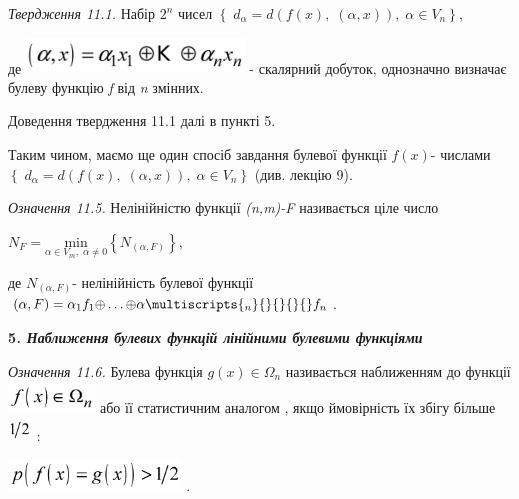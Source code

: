 \textit{Твердження 11.1.}\textit{  }Набір  ${2^{{n}}}$  чисел 
${\left\{\;d_{{\alpha }}=d(f(x),\;(\alpha ,x)),\;\alpha \in V_{{n}}\right\}}$,

де  
\includegraphics[width=2.2783in,height=0.3709in]{crypt-img/crypt-img267.png}  -
скалярний добуток, однозначно визначає булеву функцію \textit{f  }від\textit{
}\textit{n}\textit{ }змінних. 

Доведення  твердження 11.1 далі в пункті 5.

Таким чином, маємо ще один спосіб завдання булевої функції  ${f(x)}${}-  числами
  ${\left\{\;d_{{\alpha }}=d(f(x),\;(\alpha ,x)),\;\alpha \in V_{{n}}\right\}}$
(див. лекцію 9).

\textit{Означення 11.5.} Нелінійністю функції 
\textit{(}\textit{n}\textit{,}\textit{m}\textit{)-}\textit{F}\textit{ 
}називається ціле число

{\centering
 ${N_{{F}}=\underset{{\alpha \in V_{{m}},\;\alpha \neq
0}}{{\text{min}}}\left\{N_{(\alpha ,F)}\right\}}$,
\par}

де  ${N_{{(\alpha ,F)}}}${}-  нелінійність булевої функції  ${(\alpha ,F)=\alpha
_{{1}}f_{{1}}{\oplus}\dots{\oplus}\alpha
\multiscripts{_{{n}}}{}{}{\text{}}{}f_{{n}}}$.


\bigskip

{\bfseries
5\textit{. Наближення булевих функцій лінійними булевими функціями}}

\textit{Означення 11.6.}\textit{ } Булева функція  ${g(x)\in \Omega _{{n}}}$
називається\textcolor{red}{ } наближенням до функції 
\includegraphics[width=0.9098in,height=0.3354in]{crypt-img/crypt-img268.png} 
або її статистичним аналогом , якщо ймовірність їх збігу більше 
\includegraphics[width=0.25in,height=0.2362in]{crypt-img/crypt-img269.png} :

{\centering
 \includegraphics[width=1.8083in,height=0.3319in]{crypt-img/crypt-img270.png} .
\par}

